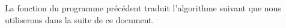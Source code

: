 	


\begin{remark}
	La fonction \emph{} du programme précédent traduit l'algorithme suivant que nous utiliserons dans la suite de ce document.
\end{remark}

{\small
\begin{algo}[frame] \label{algo-square-ko}
    \Data{$\delta \in \NNs$}
	\BlankLine
\end{algo}
}

